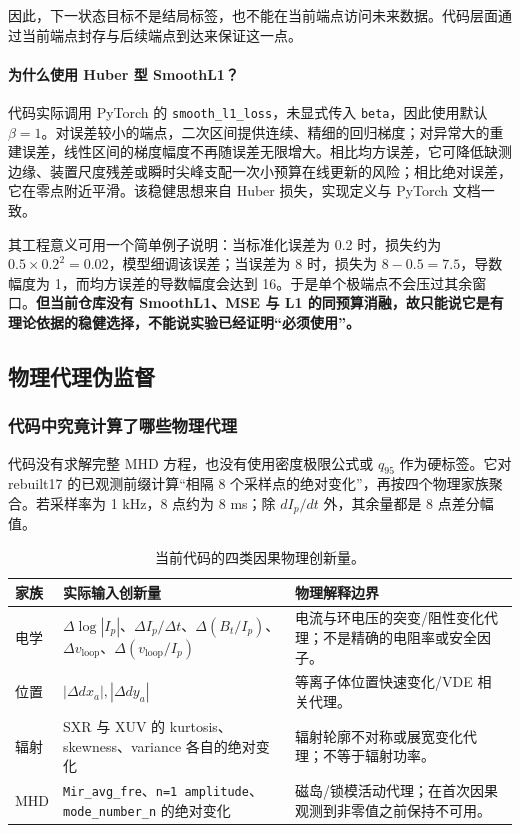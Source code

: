 \documentclass[11pt,a4paper]{article}
\newcommand{\code}[1]{\texttt{\small #1}}
\begin{document}
因此，下一状态目标不是结局标签，也不能在当前端点访问未来数据。代码层面通过当前端点封存与后续端点到达来保证这一点。

\paragraph{为什么使用 Huber 型 SmoothL1？}
代码实际调用 PyTorch 的 \code{smooth\_l1\_loss}，未显式传入 \code{beta}，因此使用默认 \(\beta=1\)。对误差较小的端点，二次区间提供连续、精细的回归梯度；对异常大的重建误差，线性区间的梯度幅度不再随误差无限增大。相比均方误差，它可降低缺测边缘、装置尺度残差或瞬时尖峰支配一次小预算在线更新的风险；相比绝对误差，它在零点附近平滑。该稳健思想来自 Huber 损失\cite{huber1964}，实现定义与 PyTorch 文档一致\cite{pytorchsmoothl1}。

其工程意义可用一个简单例子说明：当标准化误差为 0.2 时，损失约为 \(0.5\times0.2^2=0.02\)，模型细调该误差；当误差为 8 时，损失为 \(8-0.5=7.5\)，导数幅度为 1，而均方误差的导数幅度会达到 16。于是单个极端点不会压过其余窗口。\textbf{但当前仓库没有 SmoothL1、MSE 与 L1 的同预算消融，故只能说它是有理论依据的稳健选择，不能说实验已经证明“必须使用”。}

\subsection{物理代理伪监督}

\subsubsection{代码中究竟计算了哪些物理代理}

代码没有求解完整 MHD 方程，也没有使用密度极限公式或 \(q_{95}\) 作为硬标签。它对 rebuilt17 的已观测前缀计算“相隔 8 个采样点的绝对变化”，再按四个物理家族聚合。若采样率为 1 kHz，8 点约为 8 ms；除 \(dI_p/dt\) 外，其余量都是 8 点差分幅值。

\begin{table}[H]
\centering
\caption{当前代码的四类因果物理创新量。}
\small
\begin{tabularx}{\textwidth}{p{24mm} Y p{42mm}}
\toprule
家族 & 实际输入创新量 & 物理解释边界\\
\midrule
电学 & \(\Delta\log|I_p|\)、\(\Delta I_p/\Delta t\)、\(\Delta(B_t/I_p)\)、\(\Delta v_{\mathrm{loop}}\)、\(\Delta(v_{\mathrm{loop}}/I_p)\) & 电流与环电压的突变/阻性变化代理；不是精确的电阻率或安全因子。\\
位置 & \(|\Delta dx_a|,|\Delta dy_a|\) & 等离子体位置快速变化/VDE 相关代理。\\
辐射 & SXR 与 XUV 的 kurtosis、skewness、variance 各自的绝对变化 & 辐射轮廓不对称或展宽变化代理；不等于辐射功率。\\
MHD & \code{Mir\_avg\_fre}、\code{n=1 amplitude}、\code{mode\_number\_n} 的绝对变化 & 磁岛/锁模活动代理；在首次因果观测到非零值之前保持不可用。\\
\bottomrule
\end{tabularx}
\end{table}
\end{document}
